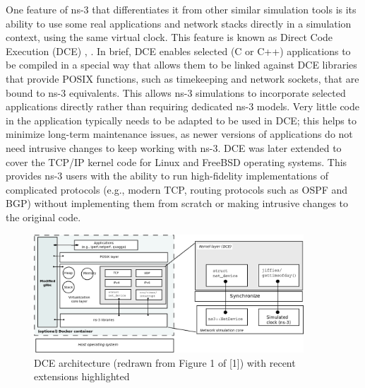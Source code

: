 \documentclass{sig-alternate}
\begin{document}
One feature of ns-3 that differentiates it from other similar simulation tools
is its ability to use some real applications and network stacks directly
in a simulation context, using the same virtual clock.  This feature is
known as Direct Code Execution (DCE) \cite{Tazaki13}, \cite{Lacage10}.  In
brief, DCE enables selected (C or C++) applications to be compiled in 
a special way that allows them to be linked against DCE libraries that
provide POSIX functions, such as timekeeping and network sockets, that
are bound to ns-3 equivalents.  This allows ns-3 simulations to incorporate
selected applications directly rather than requiring dedicated ns-3 models.
Very little code in the application typically needs to be adapted to
be used in DCE; this helps to minimize long-term maintenance issues, as
newer versions of applications do not need intrusive changes to keep
working with ns-3.  DCE was later extended to cover the TCP/IP kernel
code for Linux and FreeBSD operating systems.  This provides ns-3 users 
with the ability to run high-fidelity implementations of complicated
protocols (e.g., modern TCP, routing protocols such as OSPF and BGP)
without implementing them from scratch or making intrusive changes to
the original code. 

\begin{figure}[h!]
  \centering
    \includegraphics[width=0.9\textwidth]{figs/architecture.png}
  \caption{DCE architecture (redrawn from Figure 1 of [1]) with recent extensions highlighted}
  \label{fig:architecture}
\end{figure}
\end{document}
